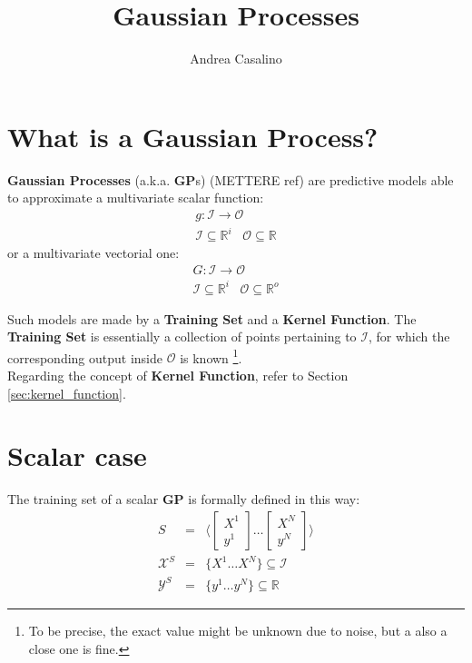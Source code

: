 \documentclass{article}
\author{Andrea Casalino}
\title{Gaussian Processes}
\begin{document}
\maketitle

\newpage
\section{What is a Gaussian Process?}

\textbf{Gaussian Processes} (a.k.a. \textbf{GP}s) (METTERE ref) are predictive models able to approximate a multivariate scalar function:
\begin{eqnarray}
g : \mathcal{I} \rightarrow \mathcal{O} \\
\mathcal{I} \subseteq \mathbb{R}^i \,\,\,\,\, \mathcal{O} \subseteq \mathbb{R}
\end{eqnarray}
or a  multivariate vectorial one:
\begin{eqnarray}
G : \mathcal{I} \rightarrow \mathcal{O} \\
\mathcal{I} \subseteq \mathbb{R}^i \,\,\,\,\, \mathcal{O} \subseteq \mathbb{R}^o 
\end{eqnarray}

Such models are made by a \textbf{Training Set} and a \textbf{Kernel Function}.
The \textbf{Training Set} is essentially a collection of points pertaining to $\mathcal{I}$, for which the corresponding output inside $\mathcal{O}$ is known \footnote{To be precise, the exact value might be unknown due to noise, but a also a close one is fine.}.
\\
Regarding the concept of \textbf{Kernel Function}, refer to Section \ref{sec:kernel_function}.

\section{Scalar case}

The training set of a scalar \textbf{GP} is formally defined in this way:
\begin{eqnarray}
S &=& 
\bigg \langle 
\begin{bmatrix} X^1 \\ y^1 \end{bmatrix}
\hdots
\begin{bmatrix} X^N \\ y^N \end{bmatrix} 
\bigg \rangle \\
\mathcal{X}^S &=& \big \lbrace X^1 \hdots X^N \big \rbrace \subseteq \mathcal{I} \\
\mathcal{Y}^S &=& \big \lbrace y^1 \hdots y^N \big \rbrace \subseteq \mathbb{R}
\end{eqnarray}
\end{document}
